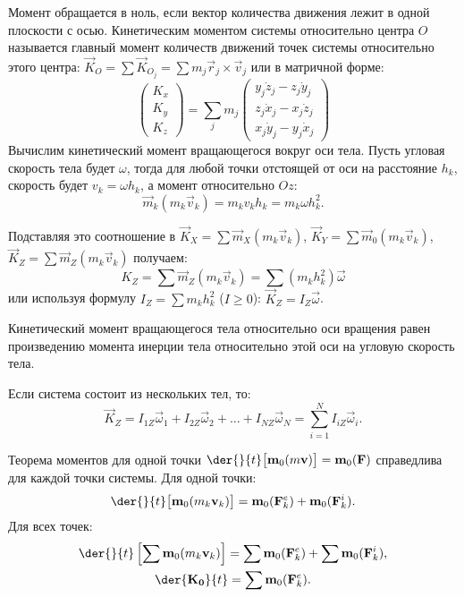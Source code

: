 Момент обращается в ноль, если вектор количества движения лежит в одной
плоскости с осью. Кинетическим моментом системы относительно центра \( O \)
называется главный момент количеств движений точек системы относительно этого
центра: \( \vec{K}_O = \sum \vec{K}_{O_j} = \sum m_j \vec{r}_j \times
\vec{v}_j \) или в матричной форме:
\[
    \begin{pmatrix} K_x \\ K_y \\ K_z \end{pmatrix} = \sum_j m_j
    \begin{pmatrix} y_j\dot{z}_j - z_j\dot{y}_j \\ z_j\dot{x}_j - x_j\dot{z}_j
    \\ x_j\dot{y}_j - y_j\dot{x}_j \end{pmatrix}
\]
Вычислим кинетический момент вращающегося вокруг оси тела. Пусть угловая
скорость тела будет \( \omega \), тогда для любой точки отстоящей от оси на
расстояние \( h_k \), скорость будет \( v_k = \omega h_k \), а момент
относительно \( Oz \):
\[
    \vec{m}_k(m_k\vec{v}_k) = m_k v_k h_k = m_k\omega h_k^2.
\]

Подставляя это соотношение в \( \vec{K}_X = \sum \vec{m}_X(m_k\vec{v}_k) \),
\( \vec{K}_Y = \sum \vec{m}_0(m_k\vec{v}_k) \), \( \vec{K}_Z = \sum \vec{m}_Z
(m_k\vec{v}_k) \) получаем:
\[
    K_Z = \sum \vec{m}_Z(m_k\vec{v}_k) = \sum (m_k h_k^2)\vec{\omega}
\] 
или используя формулу \( I_Z = \sum m_k h_k^2 \) (\( I \ge 0 \)):
\( \vec{K}_Z = I_Z\vec{\omega} \).
 
Кинетический момент вращающегося тела относительно оси вращения равен
произведению момента инерции тела относительно этой оси на угловую скорость
тела.

Если система состоит из нескольких тел, то:
\[
    \vec{K}_Z = I_{1Z}\vec{\omega}_1 + I_{2Z}\vec{\omega}_2 + \ldots +
    I_{NZ}\vec{\omega}_N = \sum_{i=1}^N I_{iZ}\vec{\omega}_i.
\]
 
Теорема моментов для одной точки \( \ds \der{}{t}\bigl[\vec{m}_0(m\vec{v})\bigr]
= \vec{m}_0(\vec{F}) \) справедлива для каждой точки системы. Для одной точки:
\[
    \der{}{t}\bigl[\vec{m}_0(m_k\vec{v}_k)\bigr] = \vec{m}_0(\vec{F}^e_k) +
    \vec{m}_0(\vec{F}^i_k).
\]
Для всех точек:
\begin{gather*}
    \der{}{t}\left[\sum\vec{m}_0(m_k\vec{v}_k)\right] =
    \sum\vec{m}_0(\vec{F}^e_k) + \sum\vec{m}_0(\vec{F}^i_k), \\
    \der{\vec{K_0}}{t} = \sum\vec{m}_0(\vec{F}^e_k).
\end{gather*}

\newpage
